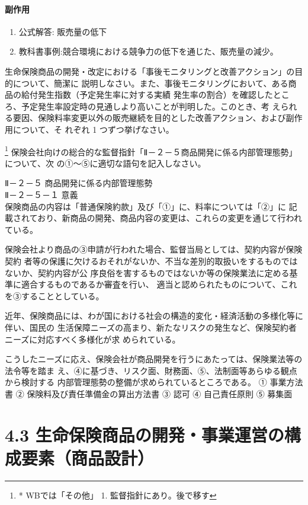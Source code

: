\documentclass[report,gutter=10mm,fore-edge=10mm,uplatex,dvipdfmx]{jlreq}
\begin{document}
\paragraph{副作用}
\begin{enumerate}
 \item 公式解答: 販売量の低下
 \item 教科書事例:競合環境における競争力の低下を通じた、販売量の減少。
\end{enumerate}

生命保険商品の開発・改定における「事後モニタリングと改善アクション」の目的について、簡潔に
説明しなさい。また、事後モニタリングにおいて、ある商品の給付発生指数（予定発生率に対する実績
発生率の割合）を確認したところ、予定発生率設定時の見通しより高いことが判明した。このとき、考
えられる要因、保険料率変更以外の販売継続を目的とした改善アクション、および副作用について、そ
れぞれ 1 つずつ挙げなさい。

\footnote{* WBでは「その他」 1. 監督指針にあり。後で移す}
保険会社向けの総合的な監督指針「Ⅱ－２－５商品開発に係る内部管理態勢」について、次
の①～⑤に適切な語句を記入しなさい。

Ⅱ－２－５ 商品開発に係る内部管理態勢\\
Ⅱ－２－５－１ 意義\\
保険商品の内容は「普通保険約款」及び「①」に、料率については「②」に
記載されており、新商品の開発、商品内容の変更は、これらの変更を通じて行われている。

保険会社より商品の③申請が行われた場合、監督当局としては、契約内容が保険契約
者等の保護に欠けるおそれがないか、不当な差別的取扱いをするものではないか、契約内容が公
序良俗を害するものではないか等の保険業法に定める基準に適合するものであるか審査を行い、
適当と認められたものについて、これを③することとしている。

近年、保険商品には、わが国における社会の構造的変化・経済活動の多様化等に伴い、国民の
生活保障ニーズの高まり、新たなリスクの発生など、保険契約者ニーズに対応すべく多様化が求
められている。

こうしたニーズに応え、保険会社が商品開発を行うにあたっては、保険業法等の法令等を踏ま
え、④に基づき、リスク面、財務面、⑤、法制面等あらゆる観点から検討する
内部管理態勢の整備が求められているところである。
① 事業方法書
② 保険料及び責任準備金の算出方法書
③ 認可
④ 自己責任原則
⑤ 募集面

\section{4.3 生命保険商品の開発・事業運営の構成要素（商品設計）}
\end{document}
